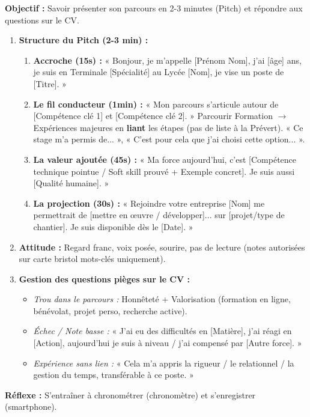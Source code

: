 \documentclass[11pt]{article}
\begin{document}
\begin{methode}
    \textbf{Objectif :} Savoir présenter son parcours en 2-3 minutes (Pitch) et répondre aux questions sur le CV.
    \begin{enumerate}
        \item \textbf{Structure du Pitch (2-3 min) :}
            \begin{enumerate}
                \item \textbf{Accroche (15s) :} « Bonjour, je m'appelle [Prénom Nom], j'ai [âge] ans, je suis en Terminale [Spécialité] au Lycée [Nom], je vise un poste de [Titre]. »
                \item \textbf{Le fil conducteur (1min) :} « Mon parcours s'articule autour de [Compétence clé 1] et [Compétence clé 2]. » Parcourir Formation $\to$ Expériences majeures en \textbf{liant} les étapes (pas de liste à la Prévert). « Ce stage m'a permis de... », « C'est pour cela que j'ai choisi cette option... ».
                \item \textbf{La valeur ajoutée (45s) :} « Ma force aujourd'hui, c'est [Compétence technique pointue / Soft skill prouvé + Exemple concret]. Je suis aussi [Qualité humaine]. »
                \item \textbf{La projection (30s) :} « Rejoindre votre entreprise [Nom] me permettrait de [mettre en œuvre / développer]... sur [projet/type de chantier]. Je suis disponible dès le [Date]. »
            \end{enumerate}
        \item \textbf{Attitude :} Regard franc, voix posée, sourire, pas de lecture (notes autorisées sur carte bristol mots-clés uniquement).
        \item \textbf{Gestion des questions pièges sur le CV :}
            \begin{itemize}
                \item \emph{Trou dans le parcours :} Honnêteté + Valorisation (formation en ligne, bénévolat, projet perso, recherche active).
                \item \emph{Échec / Note basse :} « J'ai eu des difficultés en [Matière], j'ai réagi en [Action], aujourd'hui je suis à niveau / j'ai compensé par [Autre force]. »
                \item \emph{Expérience sans lien :} « Cela m'a appris la rigueur / le relationnel / la gestion du temps, transférable à ce poste. »
            \end{itemize}
    \end{enumerate}
    \textbf{Réflexe :} S'entraîner à chronométrer (chronomètre) et s'enregistrer (smartphone).
\end{methode}
\end{document}
